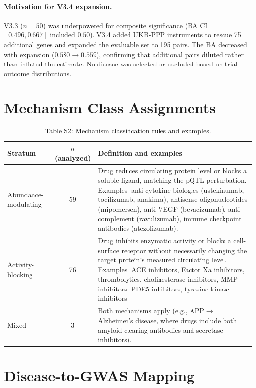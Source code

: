 \documentclass[11pt]{article}
\begin{document}
\paragraph{Motivation for V3.4 expansion.}
V3.3 ($n = 50$) was underpowered for composite significance (BA CI $[0.496, 0.667]$ included $0.50$). V3.4 added UKB-PPP instruments to rescue 75 additional genes and expanded the evaluable set to 195 pairs. The BA decreased with expansion ($0.580 \rightarrow 0.559$), confirming that additional pairs diluted rather than inflated the estimate. No disease was selected or excluded based on trial outcome distributions.

\section{Mechanism Class Assignments}
\label{supp:mechanism}

\begin{table}[H]
\centering
\caption{Table S2: Mechanism classification rules and examples.}
\label{tab:mechanism_rules}
\small
\begin{tabular}{lcp{8cm}}
\toprule
Stratum & $n$ (analyzed) & Definition and examples \\
\midrule
Abundance-modulating & 59 & Drug reduces circulating protein level or blocks a soluble ligand, matching the pQTL perturbation. Examples: anti-cytokine biologics (ustekinumab, tocilizumab, anakinra), antisense oligonucleotides (mipomersen), anti-VEGF (bevacizumab), anti-complement (ravulizumab), immune checkpoint antibodies (atezolizumab). \\
\midrule
Activity-blocking & 76 & Drug inhibits enzymatic activity or blocks a cell-surface receptor without necessarily changing the target protein's measured circulating level. Examples: ACE inhibitors, Factor Xa inhibitors, thrombolytics, cholinesterase inhibitors, MMP inhibitors, PDE5 inhibitors, tyrosine kinase inhibitors. \\
\midrule
Mixed & 3 & Both mechanisms apply (e.g., APP$\rightarrow$Alzheimer's disease, where drugs include both amyloid-clearing antibodies and secretase inhibitors). \\
\bottomrule
\end{tabular}
\end{table}

\section{Disease-to-GWAS Mapping}
\label{supp:gwas_mapping}
\end{document}

